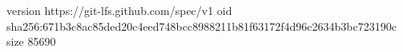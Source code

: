 version https://git-lfs.github.com/spec/v1
oid sha256:671b3c8ac85ded20c4eed748bcc8988211b81f63172f4d96c2634b3bc723190c
size 85690

